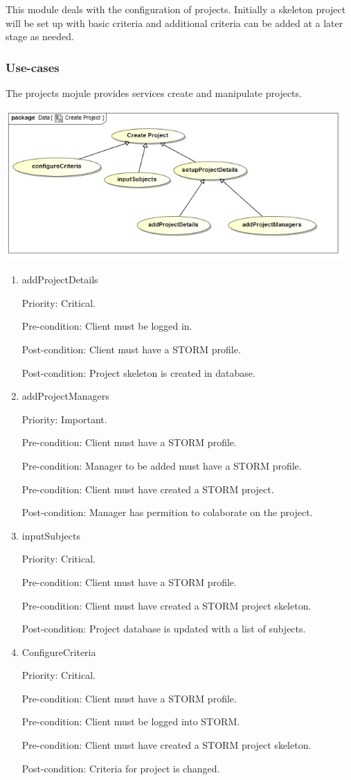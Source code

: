 This module deals with the configuration of projects. Initially a skeleton project will be set up with basic criteria 
and additional criteria can be added at a later stage as needed.
\subsubsection{Use-cases}
The projects mojule provides services create and manipulate projects.\par
\includegraphics[width=13cm]{./graphics/createProjectUseCase.jpg}
    \rule{0\linewidth}{0.15\linewidth}\par
\begin{enumerate}
\item addProjectDetails\par
Priority: Critical.\par
Pre-condition: Client must be logged in.\par
Post-condition: Client must have a STORM profile.\par
Post-condition: Project skeleton is created in database.\par
\item addProjectManagers\par
Priority: Important.\par
Pre-condition: Client must have a STORM profile.\par
Pre-condition: Manager to be added must have a STORM profile.\par
Pre-condition: Client must have created a STORM project.\par
Post-condition: Manager has permition to colaborate on the project.\par
\item inputSubjects\par
Priority: Critical.\par
Pre-condition: Client must have a STORM profile.\par
Pre-condition: Client must have created a STORM project skeleton.\par
Post-condition: Project database is updated with a list of subjects.\par
\item ConfigureCriteria\par
Priority: Critical.\par
Pre-condition: Client must have a STORM profile.\par
Pre-condition: Client must be logged into STORM.\par
Pre-condition: Client must have created a STORM project skeleton.\par
Post-condition: Criteria for project is changed.\par
\end{enumerate}
